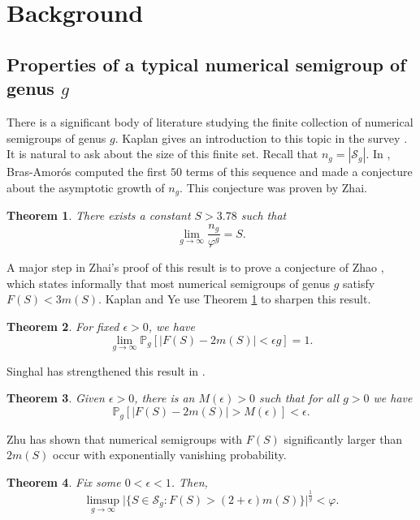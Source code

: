 \documentclass[12pt]{amsart}
\def\S{{\mathcal S}}
\renewcommand{\phi}{\varphi}
\renewcommand{\P}{\mathbb{P}}
\def\SS{{\mathcal S}}
\newtheorem{theorem}{Theorem}
\begin{document}
\section{Background}\label{sec:review_Sg}

\subsection{Properties of a typical numerical semigroup of genus $g$}


There is a significant body of literature studying the finite collection of numerical semigroups of genus $g$.  Kaplan gives an introduction to this topic in the survey \cite{KaplanCounting}.  It is natural to ask about the size of this finite set.  Recall that $n_g = |\SS_g|$.  In \cite{BA_Fibonacci}, Bras-Amor\'os computed the first $50$ terms of this sequence and made a conjecture about the asymptotic growth of $n_g$.  This conjecture was proven by Zhai.
\begin{theorem}\cite[Theorem 1]{zhai2013fibonacci}\label{thm_zhai}
There exists a constant $S> 3.78$ such that
\[
\lim_{g\to\infty}\frac{n_g}{\phi^g} = S.
\]
\end{theorem}

A major step in Zhai's proof of this result is to prove a conjecture of Zhao \cite[Conjecture~4.1]{zhao2010constructing}, which states informally that most numerical semigroups of genus $g$ satisfy $F(S) < 3m(S)$.  Kaplan and Ye use Theorem \ref{thm_zhai} to sharpen this result. 
\begin{theorem}\cite[Theorem 4]{kaplan2013proportion}\label{thm_KY_F2m}
For fixed $\epsilon > 0$, we have
\[
\lim_{g\to\infty}\P_{g}[|F(S)-2m(S)|< \epsilon g]=1.
\]
\end{theorem}

Singhal has strengthened this result in \cite{singhal2022distribution}.
\begin{theorem}\cite[Theorem 8]{singhal2022distribution}\label{F 2m}
Given $\epsilon>0$, there is an $M(\epsilon) >0$ such that for all $g > 0$ we have
\[
\P_g[|F(S)-2m(S)|>M(\epsilon)]<\epsilon.
\]
\end{theorem}

Zhu has shown that numerical semigroups with $F(S)$ significantly larger than $2m(S)$ occur with exponentially vanishing probability.  
\begin{theorem}\cite[Theorem 1.7]{zhu2023sub}
Fix some $0 < \epsilon < 1$. Then,
\[
\limsup_{g\to\infty} 
\big|\{S\in \S_g: F(S)>(2+\epsilon)m(S)\}\big|^\frac{1}{g} <\phi.
\]
\end{theorem}
\end{document}
